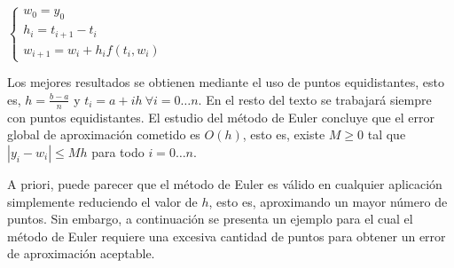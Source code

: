 \documentclass{article}
\theoremstyle{theorem-style}  %
\theoremstyle{definition-style}
\theoremstyle{example-style}
\begin{document}
	\begin{center}
		$\begin{cases}
		w_0=y_0 \\
		h_{i} = t_{i+1} - t_i \\
		w_{i+1} = w_i + h_{i} f(t_i,w_i)
		\end{cases}$
	\end{center}
	
	Los mejores resultados se obtienen mediante el uso de puntos equidistantes, esto es, $h = \frac{b-a}{n}$ y $t_i = a + ih \ \forall i = 0 \ldots n$. En el resto del texto se trabajará siempre con puntos equidistantes. El estudio del método de Euler concluye que el error global de aproximación cometido es $O(h)$, esto es, existe $M \ge 0$ tal que $\left|y_i - w_i\right| \le Mh$ para todo $i=0 \ldots n$.
				
	A priori, puede parecer que el método de Euler es válido en cualquier aplicación simplemente reduciendo el valor de $h$, esto es, aproximando un mayor número de puntos. Sin embargo, a continuación se presenta un ejemplo para el cual el método de Euler requiere una excesiva cantidad de puntos para obtener un error de aproximación aceptable. 
	
\end{document}
